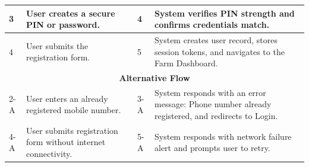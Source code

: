 \begin{table}[H]
\begin{tabular}{|p{0.6cm}|p{6.4cm}|p{0.8cm}|p{6.6cm}|}
3 & User creates a secure PIN or password. & 4 & System verifies PIN strength and confirms credentials match. \\ \hline
4 & User submits the registration form. & 5 & System creates user record, stores session tokens, and navigates to the Farm Dashboard. \\ \hline
\multicolumn{4}{|c|}{\textbf{Alternative Flow}} \\ \hline
2-A & User enters an already registered mobile number. & 3-A & System responds with an error message: Phone number already registered, and redirects to Login. \\ \hline
4-A & User submits registration form without internet connectivity. & 5-A & System responds with network failure alert and prompts user to retry. \\ \hline
\end{tabular}
\end{table}

